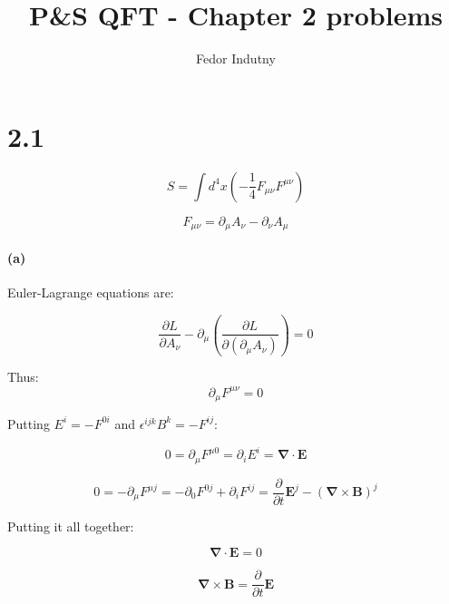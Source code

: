 \documentclass[11pt]{article}
\title{P\&S QFT - Chapter 2 problems}
\author{Fedor Indutny}
\begin{document}
\maketitle

\section*{2.1}

\begin{equation}
S = \int d^4 x \left( - \frac{1}{4} F_{\mu\nu} F^{\mu\nu} \right)
\end{equation}

\begin{equation}
F_{\mu\nu} = \partial_\mu A_\nu - \partial_\nu A_\mu
\end{equation}

\paragraph*{(a)}

Euler-Lagrange equations are:

\begin{equation}
\frac{\partial L}{\partial A_\nu} -
  \partial_\mu \left( \frac{\partial L}{\partial \left( \partial_\mu A_\nu \right) } \right) = 0
\end{equation}

Thus:
\begin{equation}
\partial_\mu F^{\mu\nu} = 0
\end{equation}

Putting $E^i = -F^{0i}$ and $\epsilon^{ijk} B^k = -F^{ij}$:

\begin{equation}
0 = \partial_\mu F^{\mu0} = \partial_i E^i = \mathbf{\nabla} \cdot \mathbf{E}
\end{equation}

\begin{equation}
0 = - \partial_\mu F^{\mu j} = - \partial_0 F^{0j} + \partial_i F^{ij} =
\frac{\partial}{\partial t} \mathbf{E}^j - \left(\mathbf{\nabla} \times \mathbf{B} \right)^j
\end{equation}

Putting it all together:

\begin{equation}
\mathbf{\nabla} \cdot \mathbf{E} = 0
\end{equation}

\begin{equation}
\mathbf{\nabla} \times \mathbf{B} = \frac{\partial}{\partial t} \mathbf{E}
\end{equation}
\end{document}
